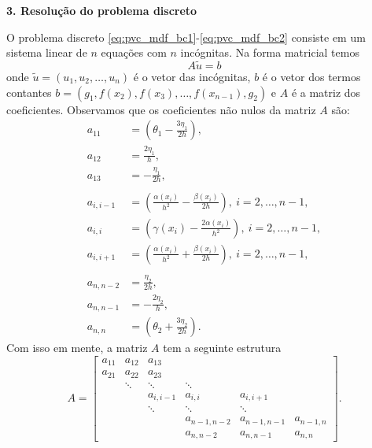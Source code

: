 \begin{flushleft}
  {\bf 3. Resolução do problema discreto}
\end{flushleft}

O problema discreto \eqref{eq:pvc_mdf_bc1}-\eqref{eq:pvc_mdf_bc2} consiste em um sistema linear de $n$ equações com $n$ incógnitas. Na forma matricial temos
\begin{equation}
  A\tilde{u} = b
\end{equation}
onde $\tilde{u} = (u_1, u_2, \dotsc, u_n)$ é o vetor das incógnitas, $b$ é o vetor dos termos contantes $b = (g_1, f(x_2), f(x_3), \dotsc, f(x_{n-1}), g_2)$ e $A$ é a matriz dos coeficientes. Observamos que os coeficientes não nulos da matriz $A$ são:
\begin{align}
  a_{11} &= \left(\theta_1 - \frac{3\eta_1}{2h}\right),\\
  a_{12} &= \frac{2\eta_1}{h},\\
  a_{13} &= - \frac{\eta_1}{2h},\\
  & ~ \nonumber \\
  a_{i,i-1} &= \left(\frac{\alpha(x_i)}{h^2}-\frac{\beta(x_i)}{2h}\right), ~i=2, \dotsc, n-1,\\
  a_{i,i} &= \left(\gamma(x_i) - \frac{2\alpha(x_i)}{h^2}\right), ~i=2, \dotsc, n-1, \\
  a_{i,i+1} &= \left(\frac{\alpha(x_i)}{h^2}+\frac{\beta(x_i)}{2h}\right), ~i=2, \dotsc, n-1,\\
  & ~ \nonumber \\
  a_{n,n-2} &= \frac{\eta_2}{2h},\\
  a_{n,n-1} &= - \frac{2\eta_2}{h},\\
  a_{n,n} &= \left(\theta_2 + \frac{3\eta_2}{2h}\right).
\end{align}
Com isso em mente, a matriz $A$ tem a seguinte estrutura
\begin{equation}
  A = \begin{bmatrix}
    a_{11} & a_{12} & a_{13} \\
    a_{21} & a_{22} & a_{23} \\
      & \ddots  & \ddots & \ddots \\
      & & a_{i,i-1} & a_{i,i} & a_{i,i+1} \\
      & & \ddots  & \ddots & \ddots \\
      & & & a_{n-1,n-2} & a_{n-1,n-1} & a_{n-1,n} \\
      & & & a_{n,n-2} & a_{n,n-1} & a_{n,n}
  \end{bmatrix}.
\end{equation}

